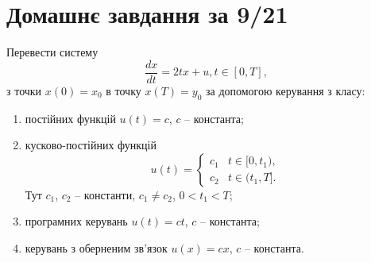 \setcounter{section}{2}

\section{Домашнє завдання за 9/21}

\setcounter{problem}{7}

\begin{problem}
    Перевести систему 
    \[ \dfrac{dx}{dt} = 2tx + u, t \in [0, T], \]
    з точки $x(0) = x_0$ в точку $x(T) = y_0$ за допомогою керування з класу:
    \begin{enumerate}
        \item постійних функцій $u(t) = c$, $c$ -- константа; 
        \item кусково-постійних функцій 
        \[
        u(t) = \begin{cases}
            c_1 & t \in [0, t_1), \\
            c_2 & t \in (t_1, T].
        \end{cases}
        \]
        Тут $c_1$, $c_2$ -- константи, $c_1 \ne c_2$, $0 < t_1 < T$;
        \item програмних керувань $u(t) = ct$, $c$ -- константа;
        \item керувань з оберненим зв'язок $u(x) = cx$, $c$ -- константа.
    \end{enumerate}
\end{problem}

